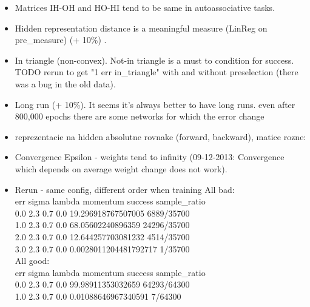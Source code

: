 \begin{itemize} 
\item Matrices IH-OH and HO-HI tend to be same in autoassociative tasks. 
\item Hidden representation distance is a meaningful measure (LinReg on pre\_measure) (+ 10\%) . 
\item In triangle (non-convex). Not-in triangle is a must to condition for success. \\
TODO rerun to get "1 err in\_triangle" with and without preselection (there was a bug in the old data). 
\item Long run (+ 10\%). It seems it's always better to have long runs. even after 800,000 epochs there are some networks for which the error change
\item reprezentacie na hidden absolutne rovnake (forward, backward), matice rozne:
\item Convergence Epsilon - weights tend to infinity (09-12-2013: Convergence which depends on average weight change does not work). 
\item Rerun - same config, different order when training 
All bad: \\
err sigma lambda momentum success sample\_ratio \\
0.0 2.3 0.7 0.0 19.296918767507005 6889/35700 \\
1.0 2.3 0.7 0.0 68.05602240896359 24296/35700 \\
2.0 2.3 0.7 0.0 12.644257703081232 4514/35700 \\
3.0 2.3 0.7 0.0 0.0028011204481792717 1/35700 \\

All good:  \\
err sigma lambda momentum success sample\_ratio \\
0.0 2.3 0.7 0.0 99.98911353032659 64293/64300 \\
1.0 2.3 0.7 0.0 0.01088646967340591 7/64300 \\
\end{itemize}




